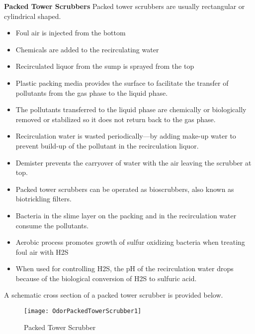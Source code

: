 \textbf{Packed Tower Scrubbers}
Packed tower scrubbers are usually rectangular or cylindrical shaped.
\begin{itemize}
\item Foul air is injected from the bottom
\item Chemicals are added to the recirculating water
\item Recirculated liquor from the sump is sprayed from the top
\item Plastic packing media provides the surface to facilitate the transfer of pollutants from the gas phase to the liquid phase.
\item The pollutants transferred to the liquid phase are chemically or biologically removed or stabilized so it does not return back to the gas phase.
\item Recirculation water is wasted periodically—by adding make-up water to prevent build-up of the pollutant in the recirculation liquor.
\item Demister prevents the carryover of water with the air leaving the scrubber at top.
\item Packed tower scrubbers can be operated as bioscrubbers, also known as biotrickling filters.
\item Bacteria in the slime layer on the packing and in the recirculation water consume the pollutants.
\item Aerobic process promotes growth of sulfur oxidizing bacteria when treating foul air with H2S
\item When used for controlling H2S, the pH of the recirculation water drops because of the biological conversion of H2S to sulfuric acid.
\end{itemize}

A schematic cross section of a packed tower scrubber is provided below.\\

\begin{figure}
	\begin{center}
		\texttt{[image: OdorPackedTowerScrubber1]}
			\caption{Packed Tower Scrubber}
	\end{center}
	
	\end{figure}
	
